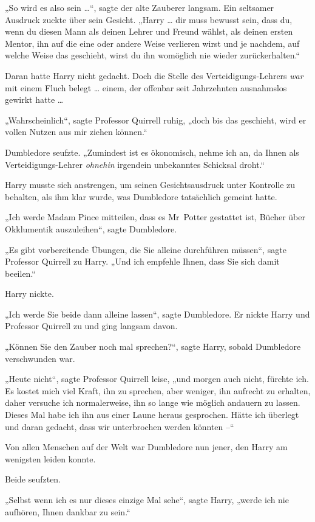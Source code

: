 {„So wird es also sein …“, sagte der alte Zauberer langsam. Ein seltsamer Ausdruck zuckte über sein Gesicht. „Harry … dir muss bewusst sein, dass du, wenn du diesen Mann als deinen Lehrer und Freund wählst, als deinen ersten Mentor, ihn auf die eine oder andere Weise verlieren wirst und je nachdem, auf welche Weise das geschieht, wirst du ihn womöglich nie wieder zurückerhalten.“

Daran hatte Harry nicht gedacht. Doch die Stelle des Verteidigungs-Lehrers \emph{war} mit einem Fluch belegt … einem, der offenbar seit Jahrzehnten ausnahmslos gewirkt hatte …

„Wahrscheinlich“, sagte Professor Quirrell ruhig, „doch bis das geschieht, wird er vollen Nutzen aus mir ziehen können.“

Dumbledore seufzte. „Zumindest ist es ökonomisch, nehme ich an, da Ihnen als Verteidigungs-Lehrer \emph{ohnehin} irgendein unbekanntes Schicksal droht.“

Harry musste sich anstrengen, um seinen Gesichtsausdruck unter Kontrolle zu behalten, als ihm klar wurde, was Dumbledore tatsächlich gemeint hatte.

„Ich werde Madam Pince mitteilen, dass es Mr~Potter gestattet ist, Bücher über Okklumentik auszuleihen“, sagte Dumbledore.

„Es gibt vorbereitende Übungen, die Sie alleine durchführen müssen“, sagte Professor Quirrell zu Harry. „Und ich empfehle Ihnen, dass Sie sich damit beeilen.“

Harry nickte.

„Ich werde Sie beide dann alleine lassen“, sagte Dumbledore. Er nickte Harry und Professor Quirrell zu und ging langsam davon.

„Können Sie den Zauber noch mal sprechen?“, sagte Harry, sobald Dumbledore verschwunden war.

„Heute nicht“, sagte Professor Quirrell leise, „und morgen auch nicht, fürchte ich. Es kostet mich viel Kraft, ihn zu sprechen, aber weniger, ihn aufrecht zu erhalten, daher versuche ich normalerweise, ihn so lange wie möglich andauern zu lassen. Dieses Mal habe ich ihn aus einer Laune heraus gesprochen. Hätte ich überlegt und daran gedacht, dass wir unterbrochen werden könnten --“

Von allen Menschen auf der Welt war Dumbledore nun jener, den Harry am wenigsten leiden konnte.

Beide seufzten.

„Selbst wenn ich es nur dieses einzige Mal sehe“, sagte Harry, „werde ich nie aufhören, Ihnen dankbar zu sein.“

}
